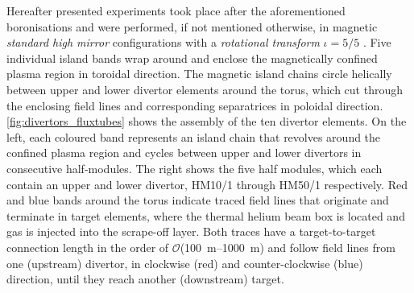 %
        Hereafter presented experiments took place after the aforementioned boronisations and were performed, if not mentioned otherwise, in magnetic \textit{standard high mirror} configurations with a \textit{rotational transform} $\iota=5/5$ \cite{Geiger2014,Effenberg2019_seed}. Five individual island bands wrap around and enclose the magnetically confined plasma region in toroidal direction. The magnetic island chains circle helically between upper and lower divertor elements around the torus, which cut through the enclosing field lines and corresponding separatrices in poloidal direction\cite{Mayer2020}. \autoref{fig:divertors_fluxtubes} shows the assembly of the ten divertor elements. On the left, each coloured band represents an island chain that revolves around the confined plasma region and cycles between upper and lower divertors in consecutive half-modules\cite{Reimold2021}. The right shows the five half modules, which each contain an upper and lower divertor, HM10/1 through HM50/1 respectively. Red and blue bands around the torus indicate traced field lines that originate and terminate in target elements, where the thermal helium beam box is located and gas is injected into the scrape-off layer. Both traces have a target-to-target connection length in the order of $\mathcal{O}$(\SIrange{100}{1000}{\meter}) and follow field lines from one (upstream) divertor, in clockwise (red) and counter-clockwise (blue) direction, until they reach another (downstream) target\cite{Effenberg2019_seed}.%
%
